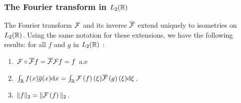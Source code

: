 \begin{frame}
\frametitle{The Fourier transform in $L_2(\mathbb{R})$}
\begin{theorem}
The Fourier transform $\mathcal{F}$ and its inverse $\overline{\mathcal{F}}$ extend uniquely to isometries on $L_2(\mathbb{R})$. Using the same notation for these extensions, we have the following results: for all $f$  and $g$ in $L_2(\mathbb{R})$ :
\begin{enumerate}[label=(\roman*)]
\item $\mathcal{F} \circ \overline{\mathcal{F}} f= \overline{\mathcal{F}} \mathcal{F} f = f$ a.e
\item $\int_{\mathbb{R}}f(x)\overline{g}(x) \mathrm{d} x=\int_{\mathbb{R}} \mathcal{F}\left( f \right)(\xi) \overline{\mathcal{F}}\left( g \right)(\xi)  \mathrm{d} \xi$.
\item  $\Vert f\Vert_{2}=\Vert \mathcal{F}\left( f \right) \Vert_{2}$.
\end{enumerate}
\end{theorem}
\end{frame}

